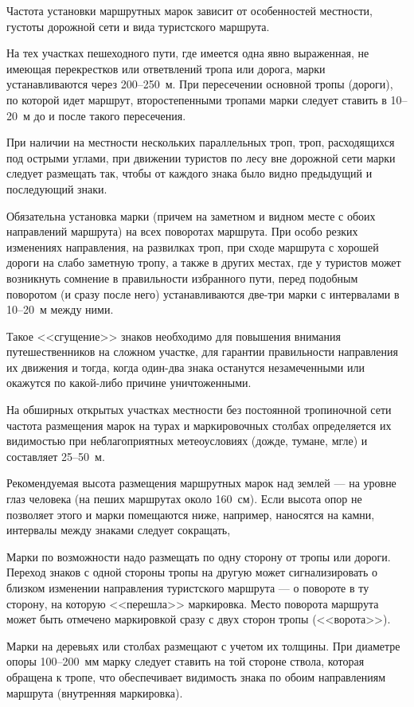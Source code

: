 \documentclass[a4paper,12pt]{extarticle}
\begin{document}
Частота установки маршрутных марок зависит от особенностей местности, густоты дорожной сети и вида туристского маршрута.

На тех участках пешеходного пути, где имеется одна явно выраженная, не имеющая перекрестков или ответвлений тропа или
дорога, марки устанавливаются через 200--250~м. При пересечении основной тропы (дороги), по которой идет маршрут,
второстепенными тропами марки следует ставить в 10--20~м до и после такого пересечения.

При наличии на местности нескольких параллельных троп, троп, расходящихся под острыми углами, при движении туристов по
лесу вне дорожной сети марки следует размещать так, чтобы от каждого знака было видно предыдущий и последующий знаки.

Обязательна установка марки (причем на заметном и видном месте с обоих направлений маршрута) на всех поворотах маршрута.
При особо резких изменениях направления, на развилках троп, при сходе маршрута с хорошей дороги на слабо заметную тропу,
а также в других местах, где у туристов может возникнуть сомнение в правильности избранного пути, перед подобным
поворотом (и сразу после него) устанавливаются две-три марки с интервалами в 10--20~м между ними.

Такое <<сгущение>> знаков необходимо для повышения внимания путешественников на сложном участке, для гарантии правильности
направления их движения и тогда, когда один-два знака останутся незамеченными или окажутся по какой-либо причине
уничтоженными.

На обширных открытых участках местности без постоянной тропиночной сети частота размещения марок на турах и
маркировочных столбах определяется их видимостью при неблагоприятных метеоусловиях (дожде, тумане, мгле) и составляет
25--50~м.

Рекомендуемая высота размещения маршрутных марок над землей --- на уровне глаз человека (на пеших маршрутах около 160~см).
Если высота опор не позволяет этого и марки помещаются ниже, например, наносятся на камни, интервалы между знаками
следует сокращать,

Марки по возможности надо размещать по одну сторону от тропы или дороги. Переход знаков с одной стороны тропы на другую
может сигнализировать о близком изменении направления туристского маршрута --- о повороте в ту сторону, на которую
<<перешла>> маркировка. Место поворота маршрута может быть отмечено маркировкой сразу с двух сторон тропы (<<ворота>>).

Марки на деревьях или столбах размещают с учетом их толщины. При диаметре опоры 100--200~мм марку следует ставить на той
стороне ствола, которая обращена к тропе, что обеспечивает видимость знака по обоим направлениям маршрута (внутренняя
маркировка).
\end{document}
